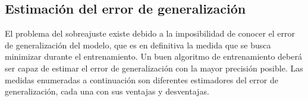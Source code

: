 %
%
\subsection{Estimación del error de generalización}
%
El problema del sobreajuste existe debido a la imposibilidad de
conocer el error de generalización del modelo, que es en definitiva la
medida que se busca minimizar durante el entrenamiento.
Un buen algoritmo de entrenamiento deberá ser capaz de estimar el
error de generalización con la mayor precisión posible.
Las medidas enumeradas a continuación son diferentes estimadores del
error de generalización, cada una con sus ventajas y desventajas.
